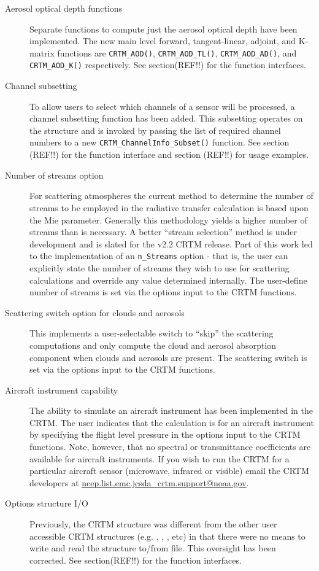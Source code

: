 \begin{description}
\item[Aerosol optical depth functions] Separate functions to compute just the aerosol optical depth have been implemented. The new main level forward, tangent-linear, adjoint, and K-matrix functions are \texttt{CRTM\_AOD()}, \texttt{CRTM\_AOD\_TL()}, \texttt{CRTM\_AOD\_AD()}, and \texttt{CRTM\_AOD\_K()} respectively. See section(REF!!) for the function interfaces.

\item[Channel subsetting] To allow users to select which channels of a sensor will be processed, a channel subsetting function has been added. This subsetting operates on the \ChannelInfo structure and is invoked by passing the list of required channel numbers to a new \texttt{CRTM\_ChannelInfo\_Subset()} function. See section (REF!!) for the function interface and section (REF!!) for usage examples.

\item[Number of streams option] For scattering atmospheres the current method to determine the number of streams to be employed in the radiative transfer calculation is based upon the Mie parameter. Generally this methodology yields a higher number of streams than is necessary. A better ``stream selection'' method is under development and is slated for the v2.2 CRTM release. Part of this work led to the implementation of an \texttt{n\_Streams} option - that is, the user can explicitly state the number of streams they wish to use for scattering calculations and override any value determined internally. The user-define number of streams is set via the options input to the CRTM functions.

\item[Scattering switch option for clouds and aerosols] This implements a user-selectable switch to ``skip'' the scattering computations and only compute the cloud and aerosol absorption component when clouds and aerosols are present. The scattering switch is set via the options input to the CRTM functions.

\item[Aircraft instrument capability] The ability to simulate an aircraft instrument has been implemented in the CRTM. The user indicates that the calculation is for an aircraft instrument by specifying the flight level pressure in the options input to the CRTM functions. Note, however, that no spectral or transmittance coefficients are available for aircraft instruments. If you wish to run the CRTM for a particular aircraft sensor (microwave, infrared or visible) email the CRTM developers at \href{mailto:ncep.list.emc.jcsda_crtm.support@noaa.gov}{ncep.list.emc.jcsda\_crtm.support@noaa.gov}.

\item[Options structure I/O] Previously, the CRTM \Options structure was different from the other user accessible CRTM structures (e.g. \Atmosphere, \Surface, \Geometry, etc) in that there were no means to write and read the structure to/from file. This oversight has been corrected. See section(REF!!) for the function interfaces.

\end{description}


